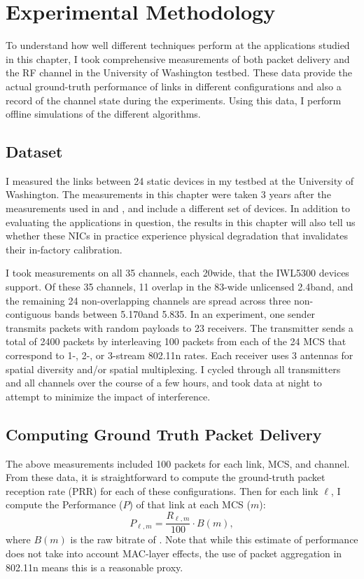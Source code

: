 \section{Experimental Methodology}
To understand how well different techniques perform at the applications studied in this chapter, I took comprehensive measurements of both packet delivery and the RF channel in the University of Washington testbed. These data provide the actual ground-truth performance of links in different configurations and also a record of the channel state during the experiments. Using this data, I perform offline simulations of the different algorithms.

\subsection{Dataset}
I measured the links between 24 static devices in my testbed at the University of Washington. The measurements in this chapter were taken 3 years after the measurements used in  and , and include a different set of devices. In addition to evaluating the applications in question, the results in this chapter will also tell us whether these NICs in practice experience physical degradation that invalidates their in-factory calibration.

I took measurements on all 35 channels, each 20\MHz wide, that the IWL5300 devices support. Of these 35 channels, 11 overlap in the 83\MHz-wide unlicensed 2.4\GHz band, and the remaining 24 non-overlapping channels are spread across three non-contiguous bands between 5.170\GHz and 5.835\GHz. In an experiment, one sender transmits packets with random payloads to 23 receivers. The transmitter sends a total of 2400 packets by interleaving 100 packets from each of the 24 MCS that correspond to 1-, 2-, or 3-stream 802.11n rates. Each receiver uses 3 antennas for spatial diversity and/or spatial multiplexing. I cycled through all transmitters and all channels over the course of a few hours, and took data at night to attempt to minimize the impact of interference.

\subsection{Computing Ground Truth Packet Delivery}
The above measurements included 100 packets for each link, MCS, and channel. From these data, it is straightforward to compute the ground-truth packet reception rate (PRR) for each of these configurations. Then for each link $\ell$, I compute the Performance ($P$) of that link at each MCS ($m$):
\begin{equation}
	\label{eq:prr_throughput}
	P_{\ell,m} = \frac{R_{\ell,m}}{100} \cdot B(m),
\end{equation}
where $B(m)$ is the raw bitrate of . Note that while this estimate of performance does not take into account MAC-layer effects, the use of packet aggregation in 802.11n means this is a reasonable proxy.

